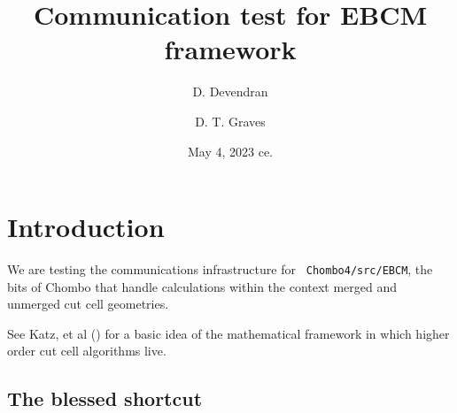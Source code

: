 \documentclass{article}
\begin{document}
\title{Communication test for EBCM framework}
\author{
    D. Devendran   \footnotemark[2] \and
    D. T. Graves    \footnotemark[1]
        }
\date{May 4, 2023 ce.}
\maketitle

\section{Introduction}

We are testing the communications infrastructure for {\tt
Chombo4/src/EBCM}, the bits of Chombo that handle calculations
within the context merged and
unmerged cut cell geometries.   

See Katz, et al (\cite{Katz 2023}) for a basic idea of the mathematical
framework in which higher order cut cell algorithms live.

\subsection{The blessed shortcut}
\end{document}
